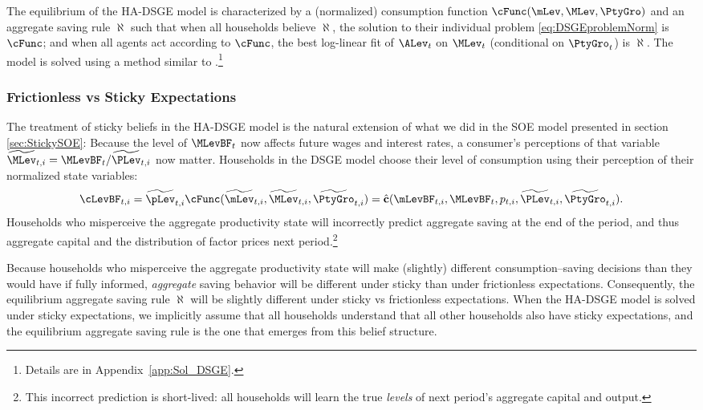 \documentclass[titlepage]{\econtex}\newcommand{\texname}{cAndCwithStickyE}
\begin{document}
The equilibrium of the HA-DSGE model is characterized by a (normalized) consumption function $\cFunc(\mLev,\MLev,\PtyGro)$ and an aggregate saving rule $\aleph$ such that when all households believe $\aleph$, the solution to their individual problem \eqref{eq:DSGEproblemNorm} is $\cFunc$; and when all agents act according to $\cFunc$, the best log-linear fit of $\ALev_t$ on $\MLev_t$ (conditional on $\PtyGro_t$) is $\aleph$.  The model is solved using a method similar to \cite{ksHetero}.\footnote{Details are in Appendix~\ref{app:Sol_DSGE}.}

\subsubsection{Frictionless vs Sticky Expectations}

The treatment of sticky beliefs in the HA-DSGE model is the natural extension of what we did in the SOE model presented in section \ref{sec:StickySOE}: Because the level of $\MLevBF_t$ now affects future wages and interest rates, a consumer's perceptions of that variable $\perc{\MLev}_{t,i} = \MLevBF_t/\perc{\PLev}_{t,i}$ now matter.  Households in the DSGE model choose their level of consumption using their perception of their normalized state variables:
\begin{equation*}
\cLevBF_{t,i} = \perc{\pLev}_{t,i} \cFunc(\perc{\mLev}_{t,i},\perc{\MLev}_{t,i},\perc{\PtyGro}_{t,i}) = \hat{\textbf{c}}(\mLevBF_{t,i},\MLevBF_{t},p_{t,i},\perc{\PLev}_{t,i},\perc{\PtyGro}_{t,i}).
\end{equation*}
Households who misperceive the aggregate productivity state will incorrectly predict aggregate saving at the end of the period, and thus aggregate capital and the distribution of factor prices next period.\footnote{This incorrect prediction is short-lived: all households will learn the true \textit{levels} of next period's aggregate capital and output.}

Because households who misperceive the aggregate productivity state will make (slightly) different consumption--saving decisions than they would have if fully informed, \textit{aggregate} saving behavior will be different under sticky than under frictionless expectations.  Consequently, the equilibrium aggregate saving rule $\aleph$ will be slightly different under sticky vs frictionless expectations.  When the HA-DSGE model is solved under sticky expectations, we implicitly assume that all households understand that all other households also have sticky expectations, and the equilibrium aggregate saving rule is the one that emerges from this belief structure.
\end{document}
